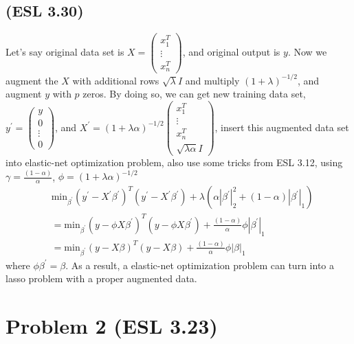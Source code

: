 \documentclass[pra,groupedaddress,amsmath,amssymb, column]{revtex4}
\begin{document}
\subsection*{(ESL 3.30)}
Let's say original data set is $X=\left( \begin{array}{c}
	x_1^T\\ \vdots \\ x_n^T
\end{array} \right)$, and original output is $y$. Now we augment the $X$ with additional rows $\sqrt{\lambda}I$ and multiply $(1+\lambda)^{-1/2}$, and augment $y$ with $p$ zeros. By doing so, we can get new training data set, $y^\prime=\left( \begin{array}{c}
	y\\ 0\\ \vdots \\ 0
\end{array} \right)$, and $X^\prime=(1+\lambda\alpha)^{-1/2}\left( \begin{array}{c}
	x_1^T\\ \vdots \\ x_n^T \\ \sqrt{\lambda\alpha}I
\end{array} \right)$, insert this augmented data set into elastic-net optimization problem, also use some tricks from ESL 3.12, using $\gamma = \frac{(1-\alpha)}{\alpha}$, $\phi=(1+\lambda\alpha)^{-1/2}$
\begin{align}
&\mathrm{min}_{\beta^\prime}(y^\prime-X^\prime\beta^\prime)^T(y^\prime-X^\prime\beta^\prime) + \lambda( \alpha |\beta^\prime|^2_2 + (1-\alpha)|\beta^\prime|_1 )\\
&=\mathrm{min}_{\beta^\prime}(y-\phi X\beta^\prime)^T(y-\phi X\beta^\prime) +\frac{(1-\alpha)}{\alpha}\phi|\beta^\prime|_1\\
&=\mathrm{min}_{\beta^\prime}(y-X\beta)^T(y- X\beta) +\frac{(1-\alpha)}{\alpha}\phi|\beta|_1
\end{align}
where $\phi\beta^\prime = \beta$. As a result, a elastic-net optimization problem can turn into a lasso problem with a proper augmented data.

\section*{Problem 2 (ESL 3.23)}
\end{document}
